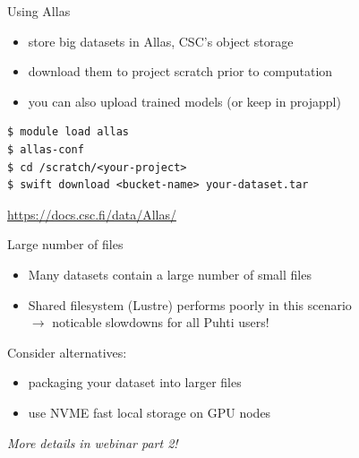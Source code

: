 \documentclass[aspectratio=1610,14pt]{beamer}
\newcommand{\link}[1]{\alert{\url{#1}}}
\newcommand{\vitem}{\vfill\item}
\begin{document}
\begin{frame}[fragile]{Using Allas}
  \begin{itemize}
  \item store big datasets in Allas, CSC's object storage
  \item download them to project scratch prior to computation
  \item you can also upload trained models (or keep in projappl)
  \end{itemize}

  \vfill
  
\begin{verbatim}
$ module load allas
$ allas-conf
$ cd /scratch/<your-project>
$ swift download <bucket-name> your-dataset.tar  
\end{verbatim}

  \link{https://docs.csc.fi/data/Allas/}
\end{frame}

\begin{frame}{Large number of files}
  \begin{itemize}
  \vitem Many datasets contain a large number of small files
  \vitem Shared filesystem (Lustre) performs poorly in this scenario \\
    $\rightarrow$ noticable slowdowns for all Puhti users!
  \end{itemize}

  \vfill
  Consider alternatives:

  \begin{itemize}
    \vitem packaging your dataset into larger files                     
    \vitem use NVME fast local storage on GPU nodes
  \end{itemize}

  \vfill
  \emph{More details in webinar part 2!}

\end{frame}



  

\end{document}
